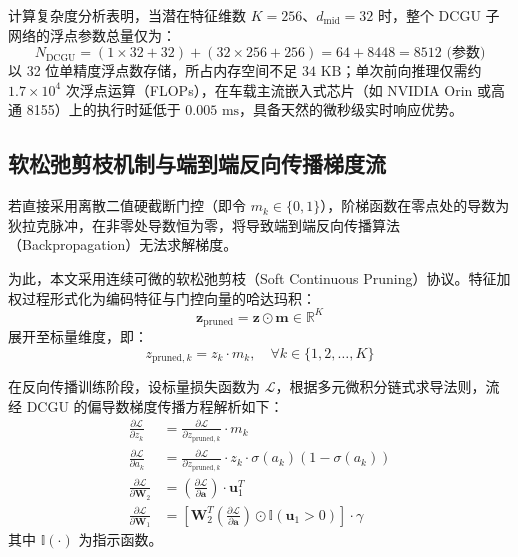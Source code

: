 计算复杂度分析表明，当潜在特征维数 $K = 256$、$d_{\text{mid}} = 32$ 时，整个 DCGU 子网络的浮点参数总量仅为：
\begin{equation}
  N_{\text{DCGU}} = (1 \times 32 + 32) + (32 \times 256 + 256) = 64 + 8448 = 8512 \text{ (参数)}
\end{equation}
以 32 位单精度浮点数存储，所占内存空间不足 $34\text{ KB}$；单次前向推理仅需约 $1.7 \times 10^4$ 次浮点运算（FLOPs），在车载主流嵌入式芯片（如 NVIDIA Orin 或高通 8155）上的执行时延低于 $0.005\text{ ms}$，具备天然的微秒级实时响应优势。

\subsection{软松弛剪枝机制与端到端反向传播梯度流}
若直接采用离散二值硬截断门控（即令 $m_k \in \{0, 1\}$），阶梯函数在零点处的导数为狄拉克脉冲，在非零处导数恒为零，将导致端到端反向传播算法（Backpropagation）无法求解梯度。

为此，本文采用连续可微的软松弛剪枝（Soft Continuous Pruning）协议。特征加权过程形式化为编码特征与门控向量的哈达玛积：
\begin{equation}
  \bm{z}_{\text{pruned}} = \bm{z} \odot \bm{m} \in \mathbb{R}^K
  \label{eq:soft_pruning_formulation}
\end{equation}
展开至标量维度，即：
\begin{equation}
  z_{\text{pruned}, k} = z_k \cdot m_k, \quad \forall k \in \{1, 2, \dots, K\}
\end{equation}

在反向传播训练阶段，设标量损失函数为 $\mathcal{L}$，根据多元微积分链式求导法则，流经 DCGU 的偏导数梯度传播方程解析如下：
\begin{align}
  \frac{\partial \mathcal{L}}{\partial z_k} &= \frac{\partial \mathcal{L}}{\partial z_{\text{pruned}, k}} \cdot m_k \label{eq:grad_to_z} \\
  \frac{\partial \mathcal{L}}{\partial a_k} &= \frac{\partial \mathcal{L}}{\partial z_{\text{pruned}, k}} \cdot z_k \cdot \sigma(a_k)(1 - \sigma(a_k)) \label{eq:grad_to_a} \\
  \frac{\partial \mathcal{L}}{\partial \bm{W}_2} &= \left( \frac{\partial \mathcal{L}}{\partial \bm{a}} \right) \cdot \bm{u}_1^T \label{eq:grad_to_W2} \\
  \frac{\partial \mathcal{L}}{\partial \bm{W}_1} &= \left[ \bm{W}_2^T \left( \frac{\partial \mathcal{L}}{\partial \bm{a}} \right) \odot \mathbb{I}(\bm{u}_1 > 0) \right] \cdot \gamma \label{eq:grad_to_W1}
\end{align}
其中 $\mathbb{I}(\cdot)$ 为指示函数。

